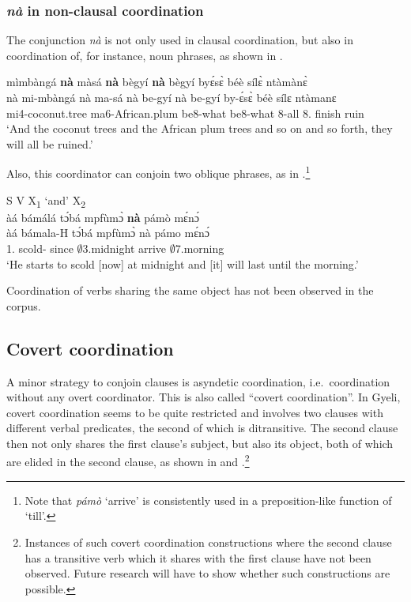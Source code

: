 \subsubsection*{{\itshape nà} in non-clausal coordination}
The conjunction {\itshape nà} is not only used in clausal coordination, but also in coordination of, for instance, noun phrases, as shown in .



\ea\label{Coord9}
   mìmbàngá {\bfseries nà} màsá {\bfseries nà} bègyí {\bfseries nà} bègyí byɛ́sɛ̀ béè sílɛ̀ ntàmànɛ̀\\
       nà mi-mbàngá nà ma-sá nà be-gyí nà be-gyí by-ɛ́sɛ̀ béè sílɛ ntàmanɛ\\
           {\CONJ} mi4-coconut.tree {\CONJ} ma6-African.plum {\CONJ} be8-what {\CONJ} be8-what 8-all 8.{\FUT} finish ruin\\
    \trans `And the coconut trees and the African plum trees and so on and so forth, they will all be ruined.'
\z

\noindent Also, this coordinator can conjoin two oblique phrases, as in .\footnote{Note that {\itshape pámò} `arrive' is consistently used in a preposition-like function of `till'.}


\ea\label{Coord10} S V X\textsubscript{1} `and' X\textsubscript{2}\\
  \glll àá bámálá tɔ́bá mpfùmɔ̀ {\bfseries nà} pámò mɛ́nɔ́\\
       àá bámala-H tɔ́bá mpfùmɔ̀ nà pámo mɛ́nɔ́\\
       1.{\INCH} scold-{\R} since  $\emptyset$3.midnight {\CONJ} arrive $\emptyset$7.morning \\
    \trans `He starts to scold [now] at midnight and [it] will last until the morning.'
\z

\noindent Coordination of verbs sharing the same object has not been observed in the corpus.


\subsection{Covert coordination}
A minor strategy to conjoin clauses is asyndetic coordination, i.e.\ coordination without any overt coordinator. This is also called ``covert coordination''. In Gyeli, covert coordination seems to be quite restricted and involves two clauses with different verbal predicates, the second of which is ditransitive. The second clause then not only shares the first clause's subject, but also its object, both of which are elided in the second clause, as shown in  and .\footnote{Instances of such covert coordination constructions where the second clause has a transitive verb which it shares with the first clause have not been observed. Future research will have to show whether such constructions are possible.}

